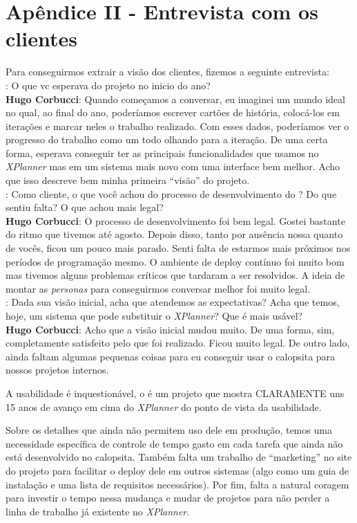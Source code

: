 \section{Apêndice II - Entrevista com os clientes}

Para conseguirmos extrair a visão dos clientes, fizemos a seguinte entrevista:\\

\textbf{\calopsita{}}: O que vc esperava do projeto no inicio do ano?\\

\textbf{Hugo Corbucci}: Quando começamos a conversar, eu imaginei um mundo ideal no qual, ao final do ano, poderíamos escrever cartões de história, colocá-los em iterações e marcar neles o trabalho realizado. Com esses dados, poderíamos ver o progresso do trabalho como um todo olhando para a iteração. De uma certa forma, esperava conseguir ter as principais funcionalidades que usamos no \textit{XPlanner} mas em um sistema mais novo com uma interface bem melhor. Acho que isso descreve bem minha primeira ``visão'' do projeto.\\

\textbf{\calopsita{}}: Como cliente, o que você achou do processo de desenvolvimento do \calopsita{}? Do que sentiu falta? O que achou mais legal?\\

\textbf{Hugo Corbucci}: O processo de desenvolvimento foi bem legal. Gostei bastante do ritmo que tivemos até agosto. Depois disso, tanto por ausência nossa quanto de vocês, ficou um pouco mais parado. Senti falta de estarmos mais próximos nos períodos de programação mesmo. O ambiente de deploy contínuo foi muito bom mas tivemos alguns problemas críticos que tardaram a ser resolvidos. A ideia de montar as \textit{personas} para conseguirmos conversar melhor foi muito legal.\\

\textbf{\calopsita{}}: Dada sua visão inicial, acha que atendemos as expectativas? Acha que temos, hoje, um sistema que pode substituir o \textit{XPlanner}? Que é mais usável?\\

\textbf{Hugo Corbucci}: Acho que a visão inicial mudou muito. De uma forma, sim, completamente satisfeito pelo que foi realizado. Ficou muito legal. De outro lado, ainda faltam algumas pequenas coisas para eu conseguir usar o calopsita para nossos projetos internos.

A usabilidade é inquestionável, o \calopsita{} é um projeto que mostra CLARAMENTE uns 15 anos de avanço em cima do \textit{XPlanner} do ponto de vista da usabilidade.

Sobre os detalhes que ainda não permitem uso dele em produção, temos uma necessidade específica de controle de tempo gasto em cada tarefa que ainda não está desenvolvido no calopsita. Também falta um trabalho de ``marketing'' no site do projeto para facilitar o deploy dele em outros sistemas (algo como um guia de instalação e uma lista de requisitos necessários). Por fim, falta a natural coragem para investir o tempo nessa mudança e mudar de projetos para não perder a linha de trabalho já existente no \textit{XPlanner}.
